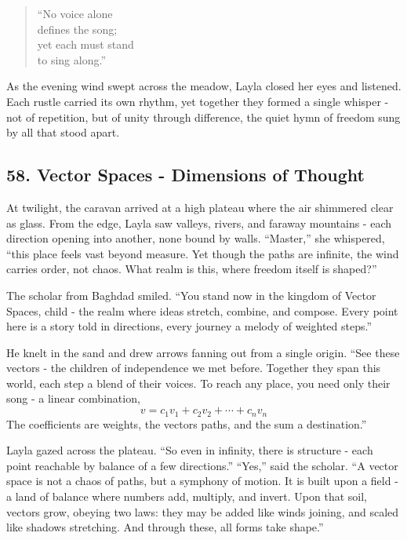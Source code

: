\documentclass[
  letterpaper,
  DIV=11,
  numbers=noendperiod]{scrreprt}
\begin{document}
\begin{quote}
``No voice alone\\
defines the song;\\
yet each must stand\\
to sing along.''
\end{quote}

As the evening wind swept across the meadow, Layla closed her eyes and
listened. Each rustle carried its own rhythm, yet together they formed a
single whisper - not of repetition, but of unity through difference, the
quiet hymn of freedom sung by all that stood apart.

\subsection{58. Vector Spaces - Dimensions of
Thought}\label{vector-spaces---dimensions-of-thought}

At twilight, the caravan arrived at a high plateau where the air
shimmered clear as glass. From the edge, Layla saw valleys, rivers, and
faraway mountains - each direction opening into another, none bound by
walls. ``Master,'' she whispered, ``this place feels vast beyond
measure. Yet though the paths are infinite, the wind carries order, not
chaos. What realm is this, where freedom itself is shaped?''

The scholar from Baghdad smiled. ``You stand now in the kingdom of
Vector Spaces, child - the realm where ideas stretch, combine, and
compose. Every point here is a story told in directions, every journey a
melody of weighted steps.''

He knelt in the sand and drew arrows fanning out from a single origin.
``See these vectors - the children of independence we met before.
Together they span this world, each step a blend of their voices. To
reach any place, you need only their song - a linear combination, \[
v = c_1v_1 + c_2v_2 + \cdots + c_nv_n
\] The coefficients are weights, the vectors paths, and the sum a
destination.''

Layla gazed across the plateau. ``So even in infinity, there is
structure - each point reachable by balance of a few directions.''
``Yes,'' said the scholar. ``A vector space is not a chaos of paths, but
a symphony of motion. It is built upon a field - a land of balance where
numbers add, multiply, and invert. Upon that soil, vectors grow, obeying
two laws: they may be added like winds joining, and scaled like shadows
stretching. And through these, all forms take shape.''
\end{document}
